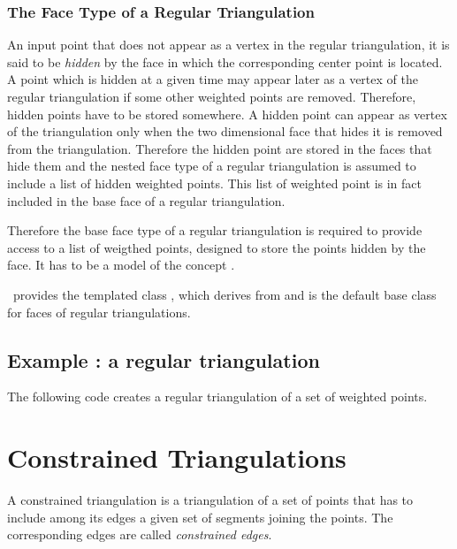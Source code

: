 \subsubsection{The Face Type of a Regular Triangulation}

An input  point that does not appear as a vertex in the
regular triangulation, it is said to be {\it hidden }
by the face in which the corresponding center point is located.
A  point which is hidden at a given time may appear later as a vertex of
the regular triangulation if some other weighted points are removed.
Therefore, hidden points have to be stored somewhere.
A hidden point can appear as vertex of the triangulation
only when the
two dimensional face that hides it
is removed from the triangulation. 
Therefore the  hidden point are stored
in the faces that  hide them and the nested face type of a 
regular triangulation is assumed to include a list of hidden 
weighted points. This list of weighted point is in fact included
in the base face of a regular triangulation.

Therefore the base face type of a regular triangulation
is required to provide access to a list of weigthed points,
designed to store the points hidden by the face. It has to be a model
of the concept .

\cgal\ provides the templated class 
,
which derives from 
and is the default base class for faces of regular triangulations.

\subsection{Example : a regular triangulation}
\label{Subsection_2D_Triangulations_Regular_Example}

The following code  creates a regular triangulation 
of a set of weighted points.



\section{Constrained Triangulations}
\label{Section_2D_Triangulations_Constrained}

\label{Subsection_2D_Triangulations_Constrained_Description}
A constrained triangulation is a triangulation of a set of points
that has to include among its edges 
a given set of segments joining the points. The corresponding 
edges are called {\em constrained edges}. 

